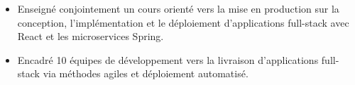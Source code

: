 \vspace{4pt}


\begin{itemize}[itemsep=1pt, topsep=1pt, leftmargin=15pt]

  \item Enseigné conjointement un cours orienté vers la mise en production sur la conception, l'implémentation et le déploiement d'applications full-stack avec React et les microservices Spring.

  \item Encadré 10 équipes de développement vers la livraison d'applications full-stack via méthodes agiles et déploiement automatisé.
\end{itemize}